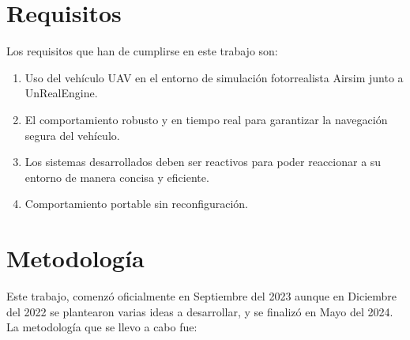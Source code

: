 \section{Requisitos}
\label{sec:requisitos}

Los requisitos que han de cumplirse en este trabajo son: 
\begin{enumerate}
    \item Uso del vehículo UAV en el entorno de simulación fotorrealista Airsim junto a UnRealEngine.
    \item El comportamiento robusto y en tiempo real para garantizar la navegación segura del vehículo.
    \item Los sistemas desarrollados deben ser reactivos para poder reaccionar a su entorno de manera concisa y eficiente.
    \item Comportamiento portable sin reconfiguración.
\end{enumerate}


\section{Metodología}
\label{sec:metodologia}

Este trabajo, comenzó oficialmente en Septiembre del 2023 aunque en Diciembre del 2022 se plantearon varias ideas a desarrollar, y se finalizó en Mayo del 2024. \\

La metodología que se llevo a cabo fue:

